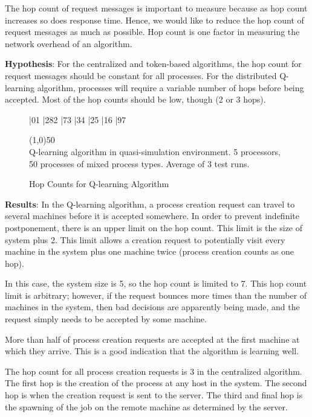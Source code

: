 \documentclass{report}
\newcommand{\hopcountbar}[3]{
\begin{figure}[H]

\begin{barenv}
\setdepth{10} %
\setstretch{1.4} %
\setnumberpos{up} %
\setxaxis{1}{7}{1}\setxname{Hop Count}
\setyaxis{0}{50}{10}\setyname{No.}
#1
\end{barenv}

\vspace{1em}
\line(1,0){50} \\
#2
\caption{#3}
\end{figure}
}
\begin{document}
The hop count of request messages is important to measure because as hop
count increases so does response time.  Hence, we would like to reduce the
hop count of request messages as much as possible.  Hop count is one factor
in measuring the network overhead of an algorithm.

\textbf{Hypothesis}:  For the centralized and token-based algorithms, the
hop count for request messages should be constant for all processes.  For
the distributed Q-learning algorithm, processes will require a variable
number of hops before being accepted.  Most of the hop counts should be low,
though (2 or 3 hops).

\hopcountbar{
\bar{0}{1}
\bar{28}{2}
\bar{7}{3}
\bar{3}{4}
\bar{2}{5}
\bar{1}{6}
\bar{9}{7}}
{Q-learning algorithm in quasi-simulation environment.  5 processors, 50
processes of mixed process types.  Average of 3 test runs.}
{Hop Counts for Q-learning Algorithm}

\textbf{Results}: In the Q-learning algorithm, a process creation request
can travel to several machines before it is accepted somewhere.  In order to
prevent indefinite postponement, there is an upper limit on the hop count.
This limit is the size of system plus 2.  This limit allows a creation
request to potentially visit every machine in the system plus one machine
twice (process creation counts as one hop).

In this case, the system size is 5, so the hop count is limited to 7.  This
hop count limit is arbitrary; however, if the request bounces more times
than the number of machines in the system, then bad decisions are apparently
being made, and the request simply needs to be accepted by some machine.

More than half of process creation requests are accepted at the first
machine at which they arrive.  This is a good indication that the algorithm
is learning well.



The hop count for all process creation requests is 3 in the centralized
algorithm.  The first hop is the creation of the process at any host in the
system.  The second hop is when the creation request is sent to the server.
The third and final hop is the spawning of the job on the remote machine as
determined by the server.


\end{document}
